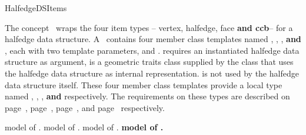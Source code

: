 
\ccRefPageBegin



\begin{ccRefConcept}{HalfedgeDSItems}

\ccDefinition
  
The concept \ccRefName\ wraps the four item types -- vertex,
halfedge, face {\bf\ttfamily and ccb}-- for a halfedge data structure.
A \ccRefName\ contains four member class templates named ,
, , {\bf\ttfamily and }
, each with two template parameters,  and .
 requires an
instantiated halfedge data structure  as argument,
 is a geometric traits class supplied by the class that
uses the halfedge data structure as internal representation. 
is not used by the halfedge data structure itself. These four member 
class templates provide a local type named , ,
,  {\bf\ttfamily and } respectively.
The requirements on these
types are described on page~\pageref{pageHalfedgeDSItemsVertexRef},
page~\pageref{pageHalfedgeDSItemsHalfedgeRef}, 
page~\pageref{pageHalfedgeDSItemsFaceRef},
and page~\pageref{pageHalfedgeDSItemsCcbRef} respectively.

\ccTypes
{}

    {model of .}
\ccGlue
{}
    {model of .}
\ccGlue
{}
    {model of .}
\ccGlue
{}
    {\bf\ttfamily model of .}

\ccHasModels

\\
\\


\end{ccRefConcept}
